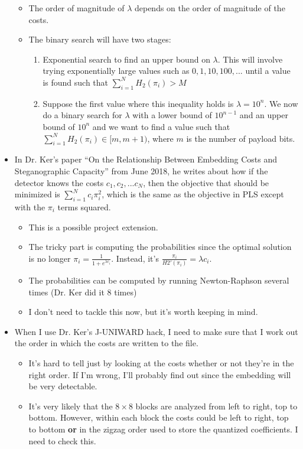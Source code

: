 \documentclass[11pt,a4paper]{report}
\begin{document}
\begin{itemize}
\begin{itemize}
  \item The order of magnitude of $\lambda$ depends on the order of magnitude of the costs.

  \item The binary search will have two stages:
    \begin{enumerate}
    \item Exponential search to find an upper bound on $\lambda$. This will involve trying exponentially large values such as $0, 1, 10, 100, ...$ until a value is found such that $\sum\limits_{i=1}^N H_2(\pi_i) > M$
    \item Suppose the first value where this inequality holds is $\lambda = 10^n$. We now do a binary search for $\lambda$ with a lower bound of $10^{n-1}$ and an upper bound of $10^n$ and we want to find a value such that $\sum\limits_{i=1}^N H_2(\pi_i) \in [m, m+1)$, where $m$ is the number of payload bits.
    \end{enumerate}
  \end{itemize}
  
\item In Dr. Ker's paper ``On the Relationship Between Embedding Costs and Steganographic Capacity'' from June 2018, he writes about how if the detector knows the costs $c_1, c_2, ... c_N$, then the objective that should be minimized is $\sum\limits_{i=1}^N c_i \pi_i^2$, which is the same as the objective in PLS except with the $\pi_i$ terms squared.
  \begin{itemize}
  \item This is a possible project extension.

  \item The tricky part is computing the probabilities since the optimal solution is no longer $\pi_i = \frac{1}{1+e^{\lambda c_i}}$. Instead, it's $\frac{\pi_i}{H2'(\pi_i)} = \lambda c_i$.

  \item The probabilities can be computed by running Newton-Raphson several times (Dr. Ker did it 8 times)

  \item I don't need to tackle this now, but it's worth keeping in mind.
  \end{itemize}

\item When I use Dr. Ker's J-UNIWARD hack, I need to make sure that I work out the order in which the costs are written to the file.
  \begin{itemize}
  \item It's hard to tell just by looking at the costs whether or not they're in the right order. If I'm wrong, I'll probably find out since the embedding will be very detectable.
  \item It's very likely that the $8\times8$ blocks are analyzed from left to right, top to bottom. However, within each block the costs could be left to right, top to bottom \textbf{or} in the zigzag order used to store the quantized coefficients. I need to check this.
  \end{itemize}


\end{itemize}
\end{document}
